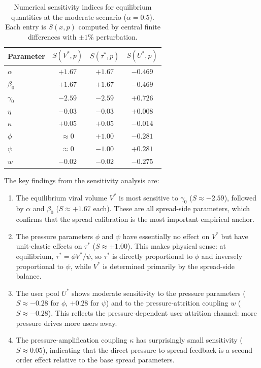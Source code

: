 \documentclass[11pt]{article}
\begin{document}
\begin{table}[H]
\centering
\caption{Numerical sensitivity indices for equilibrium quantities at the moderate scenario ($\alpha = 0.5$). Each entry is $S(x,p)$ computed by central finite differences with $\pm 1\%$ perturbation.}
\label{tab:sens}
\begin{tabular}{lccc}
\toprule
Parameter & $S(V^*, p)$ & $S(\tau^*, p)$ & $S(U^*, p)$ \\
\midrule
$\alpha$ & $+1.67$ & $+1.67$ & $-0.469$ \\
$\beta_0$ & $+1.67$ & $+1.67$ & $-0.469$ \\
$\gamma_0$ & $-2.59$ & $-2.59$ & $+0.726$ \\
$\eta$ & $-0.03$ & $-0.03$ & $+0.008$ \\
$\kappa$ & $+0.05$ & $+0.05$ & $-0.014$ \\
$\phi$ & $\approx 0$ & $+1.00$ & $-0.281$ \\
$\psi$ & $\approx 0$ & $-1.00$ & $+0.281$ \\
$w$ & $-0.02$ & $-0.02$ & $-0.275$ \\
\bottomrule
\end{tabular}
\end{table}

The key findings from the sensitivity analysis are:
\begin{enumerate}[leftmargin=1.5em]
    \item The equilibrium viral volume $V^*$ is most sensitive to $\gamma_0$ ($S \approx -2.59$), followed by $\alpha$ and $\beta_0$ ($S \approx +1.67$ each). These are all spread-side parameters, which confirms that the spread calibration is the most important empirical anchor.
    \item The pressure parameters $\phi$ and $\psi$ have essentially no effect on $V^*$ but have unit-elastic effects on $\tau^*$ ($S \approx \pm 1.00$). This makes physical sense: at equilibrium, $\tau^* = \phi V^*/\psi$, so $\tau^*$ is directly proportional to $\phi$ and inversely proportional to $\psi$, while $V^*$ is determined primarily by the spread-side balance.
    \item The user pool $U^*$ shows moderate sensitivity to the pressure parameters ($S \approx -0.28$ for $\phi$, $+0.28$ for $\psi$) and to the pressure-attrition coupling $w$ ($S \approx -0.28$). This reflects the pressure-dependent user attrition channel: more pressure drives more users away.
    \item The pressure-amplification coupling $\kappa$ has surprisingly small sensitivity ($S \approx 0.05$), indicating that the direct pressure-to-spread feedback is a second-order effect relative to the base spread parameters.
\end{enumerate}
\end{document}
